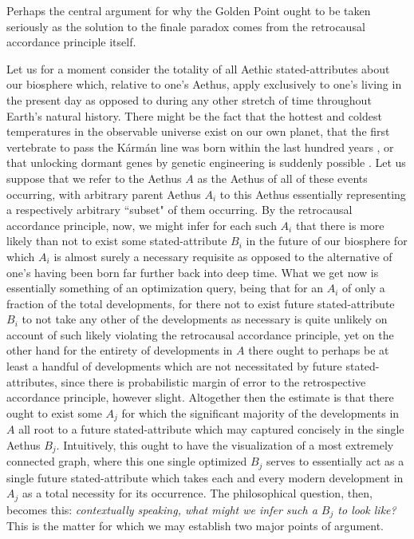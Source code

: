 Perhaps the central argument for why the Golden Point ought to be taken seriously as the solution to the finale paradox comes from the retrocausal accordance principle itself. 
\begin{concept}
    Let us for a moment consider the totality of all Aethic stated-attributes about our biosphere which, relative to one's Aethus, apply exclusively to one's living in the present day as opposed to during any other stretch of time throughout Earth's natural history. There might be the fact that the hottest \cite{ALICE2012Temperature} and coldest \cite{Kovachy2015Picokelvin} temperatures in the observable universe exist on our own planet, that the first vertebrate to pass the Kármán line was born within the last hundred years \cite{burgess2007animals}, or that unlocking dormant genes by genetic engineering is suddenly possible \cite{Pattali2026_CRISPR_epigenome_mod}. Let us suppose that we refer to the Aethus $A$ as the Aethus of all of these events occurring, with arbitrary parent Aethus $A_i$ to this Aethus essentially representing a respectively arbitrary ``subset" of them occurring. 
    By the retrocausal accordance principle, now, we might infer for each such $A_i$ that there is more likely than not to exist some stated-attribute $B_i$ in the future of our biosphere for which $A_i$ is almost surely a necessary requisite as opposed to the alternative of one's having been born far further back into deep time. What we get now is essentially something of an optimization query, being that for an $A_i$ of only a fraction of the total developments, for there not to exist future stated-attribute $B_i$ to not take any other of the developments as necessary is quite unlikely on account of such likely violating the retrocausal accordance principle, yet on the other hand for the entirety of developments in $A$ there ought to perhaps be at least a handful of developments which are not necessitated by future stated-attributes, since there is probabilistic margin of error to the retrospective accordance principle, however slight. Altogether then the estimate is that there ought to exist some $A_j$ for which the significant majority of the developments in $A$ all root to a future stated-attribute which may captured concisely in the single Aethus $B_j$. Intuitively, this ought to have the visualization of a most extremely connected graph, where this one single optimized $B_j$ serves to essentially act as a single future stated-attribute which takes each and every modern development in $A_j$ as a total necessity for its occurrence. The philosophical question, then, becomes this: \emph{contextually speaking, what might we infer such a $B_j$ to look like?} This is the matter for which we may establish two major points of argument. 

\end{concept}
